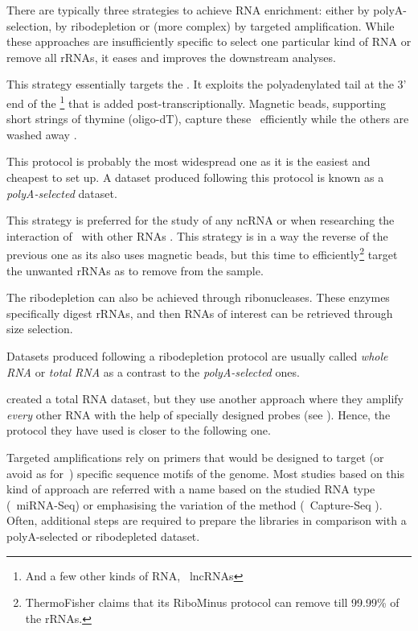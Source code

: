 There are typically three strategies to achieve \gls{RNA} enrichment:
either by polyA-selection, by ribodepletion or (more complex)
by targeted amplification. While these
approaches are insufficiently specific to select one particular kind of \gls{RNA}
or remove all \glspl{rRNA}, it eases and improves the downstream analyses.\mybr\

\label{msec:polyA}
This strategy essentially targets the \mRNAs. It exploits the polyadenylated
tail at the 3' end of the \mRNAs\footnote{And a few other kinds of \gls{RNA},
\eg\ \glspl{lncRNA} } that is added
post-transcriptionally.
Magnetic beads, supporting short strings of thymine (oligo-dT),
capture these \mRNAs\ efficiently while the others
are washed away .\mybr\

This protocol is probably the most widespread one as it is the easiest and
cheapest to set up. A dataset produced following this protocol is known as
a \emph{polyA-selected} dataset.\mybr\

This strategy is preferred for the study of any \gls{ncRNA} or when researching
the interaction of \mRNAs\ with other \glspl{RNA} . This
strategy is in a way the reverse of the previous one as its also
uses magnetic beads, but this time to efficiently\footnote{ThermoFisher claims
that its RiboMinus protocol can remove till 99.99\% of the \glspl{rRNA}.}
target the unwanted \glspl{rRNA} as to remove from the sample.\mybr\

The ribodepletion can also be achieved through ribonucleases. These enzymes
specifically digest \glspl{rRNA}, and then \glspl{RNA} of interest can be retrieved
through size selection.\mybr\

Datasets produced following a ribodepletion protocol are usually called
\emph{whole \gls{RNA}} or \emph{total \gls{RNA}} as a contrast to the
\emph{polyA-selected} ones.\mybr\

\citet{castleData} created a total \gls{RNA} dataset, but they use another
approach where they amplify \emph{every} other \gls{RNA} with the help of
specially designed probes (see ). Hence,
the protocol they have used is closer to the following one.\mybr\

Targeted amplifications rely on primers that would be designed to target (or
avoid as for~\citet{castleData}) specific sequence motifs of the genome.
Most studies based on this kind of approach are referred with
a name based on the studied \gls{RNA} type (\eg\ \gls{miRNA-Seq}) or
emphasising the variation of the method (\eg\ Capture-Seq
).
Often,  additional steps are required to prepare the libraries
in comparison with a polyA-selected or ribodepleted dataset.\mybr\

